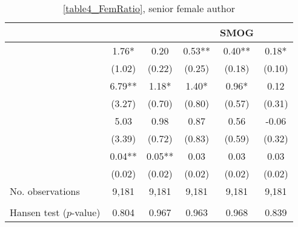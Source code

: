 \begin{table}
    \footnotesize
    \centering
    \begin{threeparttable}
        \caption{\autoref{table4_FemRatio}, senior female author}
        \label{table4_FemSenior}
        \begin{tabular}{p{4cm}S@{}S@{}S@{}S@{}S@{}}
            \toprule
            &{}&{}&{}&{SMOG}&{}\\
            \midrule
            &        1.76*  &        0.20   &        0.53** &        0.40** &        0.18*  \\
                                          &      (1.02)   &      (0.22)   &      (0.25)   &      (0.18)   &      (0.10)   \\
            &        6.79** &        1.18*  &        1.40*  &        0.96*  &        0.12   \\
                                          &      (3.27)   &      (0.70)   &      (0.80)   &      (0.57)   &      (0.31)   \\
            &        5.03   &        0.98   &        0.87   &        0.56   &       -0.06   \\
                                          &      (3.39)   &      (0.72)   &      (0.83)   &      (0.59)   &      (0.32)   \\
            &        0.04** &        0.05** &        0.03   &        0.03   &        0.03   \\
                                          &      (0.02)   &      (0.02)   &      (0.02)   &      (0.02)   &      (0.02)   \\
            \midrule
            No. observations     &       9,181   &       9,181   &       9,181   &       9,181   &       9,181   \\
             \\
            \quad Hansen test (\(p\)-value)&       0.804   &       0.967   &       0.963   &       0.968   &       0.839   \\

\end{tabular}
\end{threeparttable}
\end{table}
